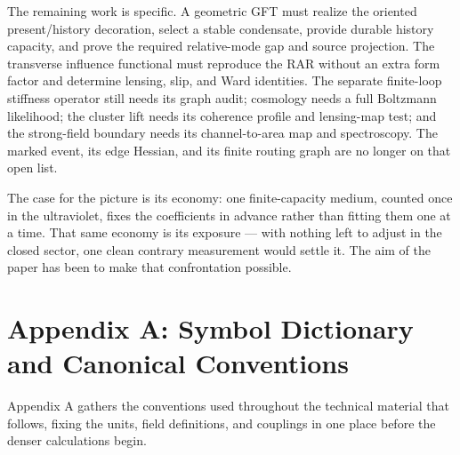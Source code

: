 \documentclass[11pt]{article}
\begin{document}
The remaining work is specific. A geometric GFT must realize the oriented present/history decoration, select a stable condensate, provide durable history capacity, and prove the required relative-mode gap and source projection. The transverse influence functional must reproduce the RAR without an extra form factor and determine lensing, slip, and Ward identities. The separate finite-loop stiffness operator still needs its graph audit; cosmology needs a full Boltzmann likelihood; the cluster lift needs its coherence profile and lensing-map test; and the strong-field boundary needs its channel-to-area map and spectroscopy. The marked event, its edge Hessian, and its finite routing graph are no longer on that open list.

The case for the picture is its economy: one finite-capacity medium, counted once in the ultraviolet, fixes the coefficients in advance rather than fitting them one at a time. That same economy is its exposure --- with nothing left to adjust in the closed sector, one clean contrary measurement would settle it. The aim of the paper has been to make that confrontation possible.

\clearpage
\section*{Appendix A: Symbol Dictionary and Canonical Conventions}

Appendix A gathers the conventions used throughout the technical material that follows, fixing the units, field definitions, and couplings in one place before the denser calculations begin.
\end{document}
